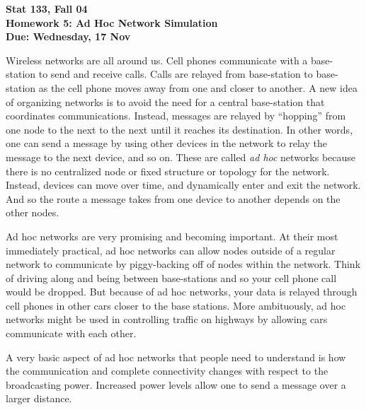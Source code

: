 \documentclass[12pt]{article}
\begin{document}
\noindent
\textbf{Stat 133, Fall 04 \\
Homework 5: Ad Hoc Network Simulation\\
Due:  Wednesday, 17 Nov}

\medskip

Wireless networks are all around us.  Cell phones communicate with a
base-station to send and receive calls.  Calls are relayed from
base-station to base-station as the cell phone moves away from one and
closer to another.  A new idea of organizing networks is to avoid the
need for a central base-station that coordinates communications.
Instead, messages are relayed by ``hopping'' from one node to the next
to the next until it reaches its destination.  In other words, one can
send a message by using other devices in the network to relay the
message to the next device, and so on.  These are called \textit{ad
 hoc} networks because there is no centralized node or fixed
structure or topology for the network. Instead, devices can move over
time, and dynamically enter and exit the network.  And so the route a
message takes from one device to another depends on the other nodes.

Ad hoc networks are very promising and becoming important.  At their
most immediately practical, ad hoc networks can allow nodes outside of
a regular network to communicate by piggy-backing off of nodes within
the network.  Think of driving along and being between base-stations
and so your cell phone call would be dropped. But because of ad hoc
networks, your data is relayed through cell phones in other cars
closer to the base stations.  More ambituously, ad hoc networks might
be used in controlling traffic on highways by allowing cars
communicate with each other.

A very basic aspect of ad hoc networks that people need to understand
is how the communication and complete connectivity changes with
respect to the broadcasting power.  Increased power levels allow one to
send a message over a larger distance. 
\end{document}
